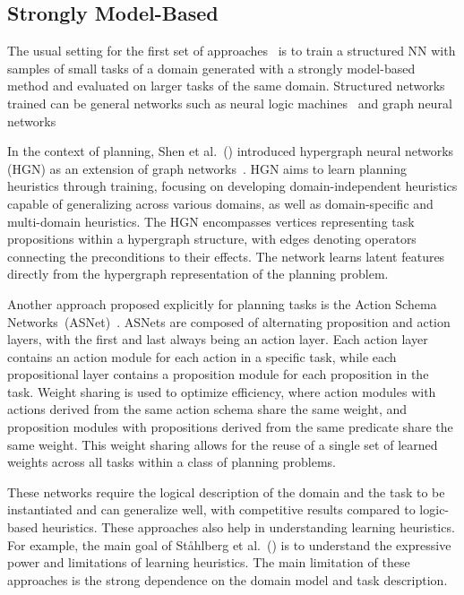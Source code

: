 \subsection{Strongly Model-Based}

The usual setting for the first set of approaches~\cite{Toyer.etal/2018,Shen.etal/2020,Toyer.etal/2020,Gehring.etal/2022,Stahlberg.etal/2022} is to train a structured NN with samples of small tasks of a domain generated with a strongly model-based method and evaluated on larger tasks of the same domain. Structured networks trained can be general networks such as neural logic machines~\cite{Dong.etal/2018} and graph neural networks~\cite{Gori.etal/2005,Scarselli.etal/2008}

In the context of planning, Shen et al.~(\citeyear{Shen.etal/2020}) introduced hypergraph neural networks (HGN) as an extension of graph networks~\cite{Battaglia.etal/2018}. HGN aims to learn planning heuristics through training, focusing on developing domain-independent heuristics capable of generalizing across various domains, as well as domain-specific and multi-domain heuristics. The HGN encompasses vertices representing task propositions within a hypergraph structure, with edges denoting operators connecting the preconditions to their effects. The network learns latent features directly from the hypergraph representation of the planning problem.

Another approach proposed explicitly for planning tasks is the Action Schema Networks~(ASNet)~\cite{Toyer.etal/2018}. ASNets are composed of alternating proposition and action layers, with the first and last always being an action layer. Each action layer contains an action module for each action in a specific task, while each propositional layer contains a proposition module for each proposition in the task. Weight sharing is used to optimize efficiency, where action modules with actions derived from the same action schema share the same weight, and proposition modules with propositions derived from the same predicate share the same weight. This weight sharing allows for the reuse of a single set of learned weights across all tasks within a class of planning problems.

These networks require the logical description of the domain and the task to be instantiated and can generalize well, with competitive results compared to logic-based heuristics. These approaches also help in understanding learning heuristics. For example, the main goal of St\aa hlberg et al.~(\citeyear{Stahlberg.etal/2022}) is to understand the expressive power and limitations of learning heuristics. The main limitation of these approaches is the strong dependence on the domain model and task description.

